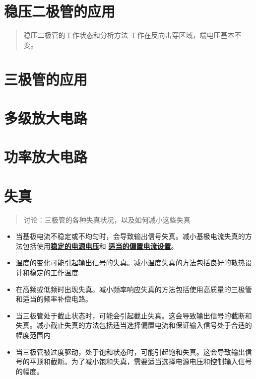 \documentclass[twocolumn]{ctexart}
\begin{document}
\section{稳压二极管的应用}
\begin{quote}
{\qquad{}\ccwd\kaishu{}
稳压二极管的工作状态和分析方法
}
工作在反向击穿区域，端电压基本不变。
\end{quote}
\section{三极管的应用}
\section{多级放大电路}
\section{功率放大电路}
\section{失真}
\begin{quote}
{\qquad{}\ccwd\kaishu{}
讨论：三极管的各种失真状况，以及如何减小这些失真
}
\end{quote}
\begin{itemize}
\item 当基极电流不稳定或不均匀时，会导致输出信号失真。减小基极电流失真的方法包括使用\underline{\textbf{稳定的电源电压}}和
\textbf{\underline{适当的偏置电流设置}}。
\item 温度的变化可能引起输出信号的失真。减小温度失真的方法包括良好的散热设计和稳定的工作温度
\item 在高频或低频时出现失真。减小频率响应失真的方法包括使用高质量的三极管和适当的频率补偿电路。
\item 当三极管处于截止状态时，可能会引起截止失真。这会导致输出信号的截断和失真。减小截止失真的方法包括适当选择偏置电流和保证输入信号处于合适的幅度范围内
\item 当三极管被过度驱动，处于饱和状态时，可能引起饱和失真。这会导致输出信号的平顶和截断。为了减小饱和失真，需要适当选择电源电压和控制输入信号的幅度。
\end{itemize}
\end{document}

